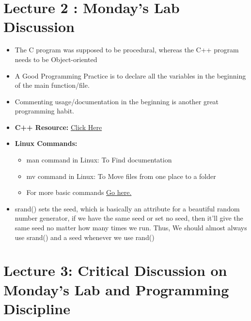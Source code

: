 \documentclass{article}
\begin{document}
\section{Lecture 2 : Monday's Lab Discussion}

\begin{itemize}
    \item The C program was supposed to be procedural, whereas the C++ program needs to be Object-oriented

    \item A Good Programming Practice is to declare all the variables in the beginning of the main function/file.

    \item Commenting usage/documentation in the beginning is another
    great programming habit.

    \item \textbf{C++ Resource:} \href{www.cplusplus.com}{Click Here}
    \item \textbf{Linux Commands:}
    \begin{itemize}
        \item man command in Linux: To Find documentation
         \item mv command in Linux: To Move files from one place to a folder
         \item For more basic commands \href{https://www.hostinger.in/tutorials/linux-commands}{Go here.}
    \end{itemize}

     \item srand() sets the seed, which is basically an attribute for a beautiful random number generator, if we have the same seed or set no seed, then it'll give the same seed no matter how many times we run. Thus, We should almost always use srand() and a seed whenever we use rand()
\end{itemize}

\section{Lecture 3: Critical Discussion on Monday's Lab and Programming Discipline}
\end{document}
